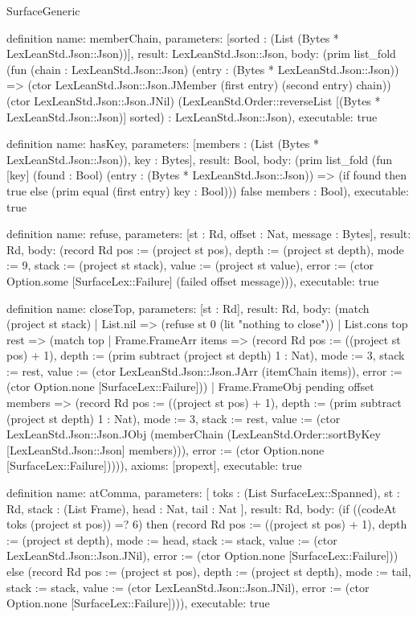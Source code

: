 \begin{lexlean}{SurfaceGeneric}
\begin{semanticmodule}
definition{
  name: memberChain,
  parameters: [sorted : (List (Bytes * LexLeanStd.Json::Json))],
  result: LexLeanStd.Json::Json,
  body: (prim list_fold (fun (chain : LexLeanStd.Json::Json) (entry : (Bytes * LexLeanStd.Json::Json)) => (ctor LexLeanStd.Json::Json.JMember (first entry) (second entry) chain)) (ctor LexLeanStd.Json::Json.JNil) (LexLeanStd.Order::reverseList [(Bytes * LexLeanStd.Json::Json)] sorted) : LexLeanStd.Json::Json),
  executable: true
}

definition{
  name: hasKey,
  parameters: [members : (List (Bytes * LexLeanStd.Json::Json)), key : Bytes],
  result: Bool,
  body: (prim list_fold (fun [key] (found : Bool) (entry : (Bytes * LexLeanStd.Json::Json)) => (if found then true else (prim equal (first entry) key : Bool))) false members : Bool),
  executable: true
}

definition{
  name: refuse,
  parameters: [st : Rd, offset : Nat, message : Bytes],
  result: Rd,
  body: (record Rd {pos := (project st pos), depth := (project st depth), mode := 9, stack := (project st stack), value := (project st value), error := (ctor Option.some [SurfaceLex::Failure] (failed offset message))}),
  executable: true
}

definition{
  name: closeTop,
  parameters: [st : Rd],
  result: Rd,
  body: (match (project st stack)
    | List.nil => (refuse st 0 (lit "nothing to close"))
    | List.cons top rest => (match top
      | Frame.FrameArr items => (record Rd {pos := ((project st pos) + 1), depth := (prim subtract (project st depth) 1 : Nat), mode := 3, stack := rest, value := (ctor LexLeanStd.Json::Json.JArr (itemChain items)), error := (ctor Option.none [SurfaceLex::Failure])})
      | Frame.FrameObj pending offset members => (record Rd {pos := ((project st pos) + 1), depth := (prim subtract (project st depth) 1 : Nat), mode := 3, stack := rest, value := (ctor LexLeanStd.Json::Json.JObj (memberChain (LexLeanStd.Order::sortByKey [LexLeanStd.Json::Json] members))), error := (ctor Option.none [SurfaceLex::Failure])}))),
  axioms: [propext],
  executable: true
}

definition{
  name: atComma,
  parameters: [
    toks : (List SurfaceLex::Spanned),
    st : Rd,
    stack : (List Frame),
    head : Nat,
    tail : Nat
  ],
  result: Rd,
  body: (if ((codeAt toks (project st pos)) =? 6) then (record Rd {pos := ((project st pos) + 1), depth := (project st depth), mode := head, stack := stack, value := (ctor LexLeanStd.Json::Json.JNil), error := (ctor Option.none [SurfaceLex::Failure])}) else (record Rd {pos := (project st pos), depth := (project st depth), mode := tail, stack := stack, value := (ctor LexLeanStd.Json::Json.JNil), error := (ctor Option.none [SurfaceLex::Failure])})),
  executable: true
}


\end{semanticmodule}
\end{lexlean}
